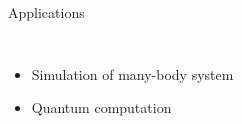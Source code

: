 \documentclass{beamer}
\begin{document}
%
\begin{frame}{Applications}
  \begin{columns}
    \column{4.5cm}
    \begin{itemize}
    \item<2-> Simulation of many-body system
    \item<3-> Quantum computation
    \end{itemize}
    \column{8cm}
    \begin{center}
      \begin{tikzpicture}
      \end{tikzpicture}
    \end{center}
  \end{columns}
\end{frame}
\end{document}
